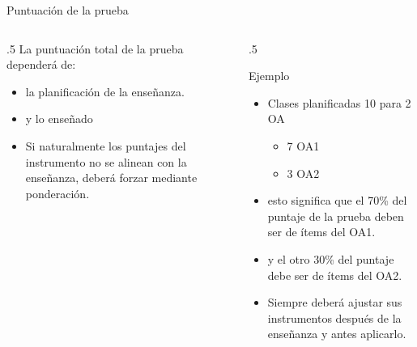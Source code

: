 \documentclass[11pt, aspectratio=169, xcolor=table,hyphens]{beamer}
\begin{document}
\begin{frame}{Puntuación de la prueba}
	\begin{columns}
		\begin{column}{.5\linewidth}
			La puntuación total de la prueba dependerá de:
			\begin{itemize}[<+->]
				\item la planificación de la enseñanza.
				\item y lo enseñado
				\item<9->[OJO] Si naturalmente los puntajes del instrumento no se alinean con la enseñanza, deberá forzar mediante ponderación.
			\end{itemize}
		\end{column}
		\begin{column}{.5\linewidth}
			\begin{exampleblock}{Ejemplo}
				\begin{itemize}[<+->]
					\item Clases planificadas 10 para 2 OA
					      \begin{itemize}
						      \item 7 OA1
						      \item 3 OA2
					      \end{itemize}
					\item esto significa que el 70\% del puntaje de la prueba deben ser de ítems del OA1.
					\item y el otro 30\% del puntaje debe ser de ítems del OA2.
					\item[\checkmark] Siempre deberá ajustar sus instrumentos después de la enseñanza y antes aplicarlo.
				\end{itemize}
			\end{exampleblock}
		\end{column}
	\end{columns}
\end{frame}
\end{document}

